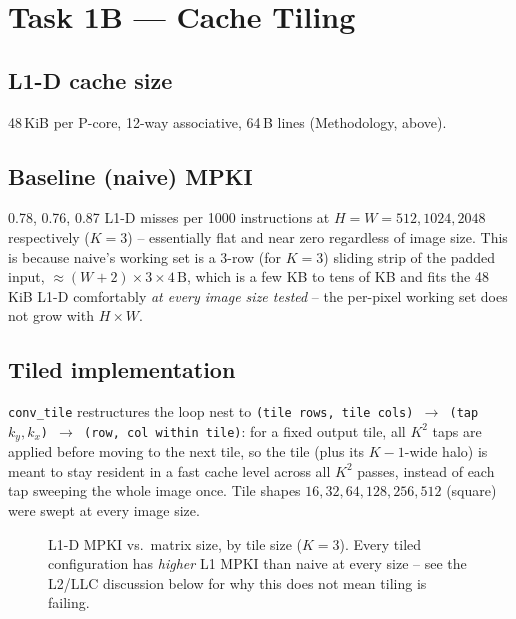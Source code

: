 \documentclass[11pt]{article}
\begin{document}
\section{Task 1B --- Cache Tiling}

\subsection*{L1-D cache size}
48\,KiB per P-core, 12-way associative, 64\,B lines (Methodology, above).

\subsection*{Baseline (naive) MPKI}
0.78, 0.76, 0.87 L1-D misses per 1000 instructions at $H{=}W{=}512,1024,2048$
respectively ($K{=}3$) -- essentially flat and near zero regardless of image size. This
is because naive's working set is a 3-row (for $K{=}3$) sliding strip of the padded
input, $\approx (W{+}2)\times 3 \times 4\,\text{B}$, which is a few KB to tens of KB and
fits the 48\,KiB L1-D comfortably \emph{at every image size tested} -- the per-pixel
working set does not grow with $H \times W$.

\subsection*{Tiled implementation}
\texttt{conv\_tile} restructures the loop nest to \texttt{(tile rows, tile cols)
$\to$ (tap $k_y,k_x$) $\to$ (row, col within tile)}: for a fixed output tile, all $K^2$
taps are applied before moving to the next tile, so the tile (plus its $K{-}1$-wide
halo) is meant to stay resident in a fast cache level across all $K^2$ passes, instead of
each tap sweeping the whole image once. Tile shapes $16,32,64,128,256,512$ (square) were
swept at every image size.

\begin{figure}[h]
\centering
{}
\caption{L1-D MPKI vs.\ matrix size, by tile size ($K{=}3$). Every tiled configuration
has \emph{higher} L1 MPKI than naive at every size -- see the L2/LLC discussion below
for why this does not mean tiling is failing.}
\end{figure}
\end{document}
